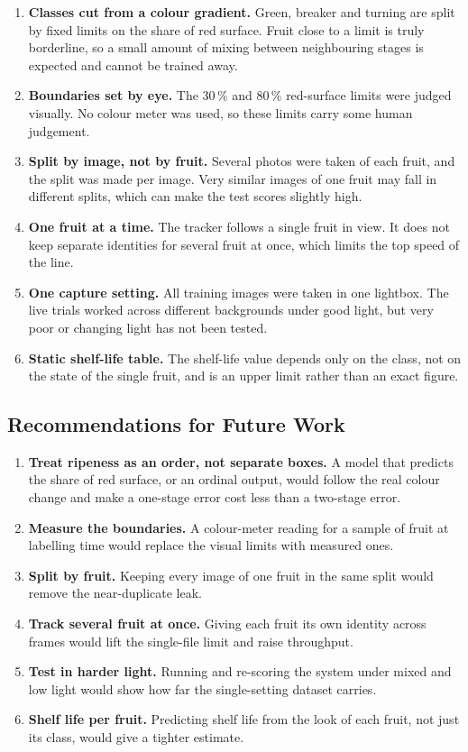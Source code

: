 \begin{enumerate}
    \item \textbf{Classes cut from a colour gradient.} Green, breaker and turning are split by fixed limits on the share of red surface. Fruit close to a limit is truly borderline, so a small amount of mixing between neighbouring stages is expected and cannot be trained away.
    \item \textbf{Boundaries set by eye.} The 30\,\% and 80\,\% red-surface limits were judged visually. No colour meter was used, so these limits carry some human judgement.
    \item \textbf{Split by image, not by fruit.} Several photos were taken of each fruit, and the split was made per image. Very similar images of one fruit may fall in different splits, which can make the test scores slightly high.
    \item \textbf{One fruit at a time.} The tracker follows a single fruit in view. It does not keep separate identities for several fruit at once, which limits the top speed of the line.
    \item \textbf{One capture setting.} All training images were taken in one lightbox. The live trials worked across different backgrounds under good light, but very poor or changing light has not been tested.
    \item \textbf{Static shelf-life table.} The shelf-life value depends only on the class, not on the state of the single fruit, and is an upper limit rather than an exact figure.
\end{enumerate}

\subsection{Recommendations for Future Work}
\label{sec:c_future}

\begin{enumerate}
    \item \textbf{Treat ripeness as an order, not separate boxes.} A model that predicts the share of red surface, or an ordinal output, would follow the real colour change and make a one-stage error cost less than a two-stage error.
    \item \textbf{Measure the boundaries.} A colour-meter reading for a sample of fruit at labelling time would replace the visual limits with measured ones.
    \item \textbf{Split by fruit.} Keeping every image of one fruit in the same split would remove the near-duplicate leak.
    \item \textbf{Track several fruit at once.} Giving each fruit its own identity across frames would lift the single-file limit and raise throughput.
    \item \textbf{Test in harder light.} Running and re-scoring the system under mixed and low light would show how far the single-setting dataset carries.
    \item \textbf{Shelf life per fruit.} Predicting shelf life from the look of each fruit, not just its class, would give a tighter estimate.
\end{enumerate}

